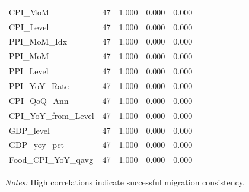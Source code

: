 \begin{table}[!htbp]
\begin{threeparttable}
\begin{tabular}{lrrrr}
CPI\_MoM & 47 & 1.000 & 0.000 & 0.000\\
\addlinespace
CPI\_Level & 47 & 1.000 & 0.000 & 0.000\\
PPI\_MoM\_Idx & 47 & 1.000 & 0.000 & 0.000\\
PPI\_MoM & 47 & 1.000 & 0.000 & 0.000\\
PPI\_Level & 47 & 1.000 & 0.000 & 0.000\\
PPI\_YoY\_Rate & 47 & 1.000 & 0.000 & 0.000\\
\addlinespace
CPI\_QoQ\_Ann & 47 & 1.000 & 0.000 & 0.000\\
CPI\_YoY\_from\_Level & 47 & 1.000 & 0.000 & 0.000\\
GDP\_level & 47 & 1.000 & 0.000 & 0.000\\
GDP\_yoy\_pct & 47 & 1.000 & 0.000 & 0.000\\
Food\_CPI\_YoY\_qavg & 47 & 1.000 & 0.000 & 0.000\\
\bottomrule
\end{tabular}
\begin{tablenotes}[flushleft]
\footnotesize
\item \textit{Notes:} High correlations indicate successful migration consistency.
\end{tablenotes}
\end{threeparttable}
\end{table}
